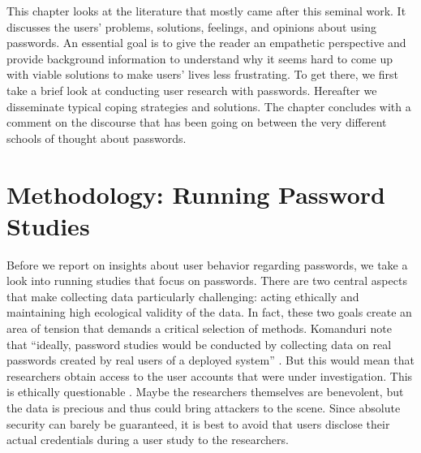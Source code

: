 This chapter looks at the literature that mostly came after this seminal work. It discusses the users' problems, solutions, feelings, and opinions about using passwords. An essential goal is to give the reader an empathetic perspective and provide background information to understand why it seems hard to come up with viable solutions to make users' lives less frustrating. To get there, we first take a brief look at conducting user research with passwords. Hereafter we disseminate typical coping strategies and solutions. The chapter concludes with a comment on the discourse that has been going on between the very different schools of thought about passwords. 




\section{Methodology: Running Password Studies}\label{sec:rw:methodology}
Before we report on insights about user behavior regarding passwords, we take a look into running studies that focus on passwords. There are two central aspects that make collecting data particularly challenging: acting ethically and maintaining high ecological validity of the data. In fact, these two goals create an area of tension that demands a critical selection of methods. Komanduri \etal note that ``ideally, password studies would be conducted by collecting data on real passwords created by real users of a deployed system'' \cite{Komanduri2011OfPasswordsAndPeople}. But this would mean that researchers obtain access to the user accounts that were under investigation. This is ethically questionable \cite{Egelman2012ItsNotStealing}. Maybe the researchers themselves are benevolent, but the data is precious and thus could bring attackers to the scene. Since absolute security can barely be guaranteed, it is best to avoid that users disclose their actual credentials during a user study to the researchers.

